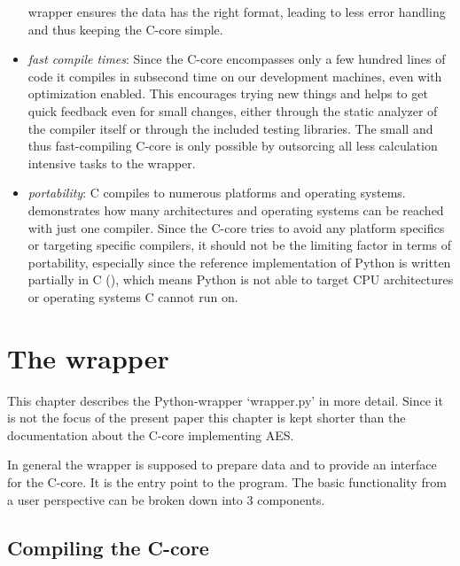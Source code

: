\begin{itemize}
  wrapper ensures the data has the right format, leading to less error
  handling and thus keeping the C-core simple.
\item
  \emph{fast compile times}: Since the C-core encompasses only a few
  hundred lines of code it compiles in subsecond time on our development
  machines, even with optimization enabled. This encourages trying new
  things and helps to get quick feedback even for small changes, either
  through the static analyzer of the compiler itself or through the
  included testing libraries. The small and thus fast-compiling C-core
  is only possible by outsorcing all less calculation intensive tasks to
  the wrapper.
\item
  \emph{portability}: C compiles to numerous platforms and operating
  systems. \cite{gccsys} demonstrates how
  many architectures and operating systems can be reached with just one
  compiler. Since the C-core tries to avoid any platform specifics or
  targeting specific compilers, it should not be the limiting factor in
  terms of portability, especially since the reference implementation of
  Python is written partially in C (\cite{pyref}),
  which means Python is not able to target CPU architectures or
  operating systems C cannot run on.
\end{itemize}


\hypertarget{the-wrapper}{%
\section{The wrapper}\label{the-wrapper}}

This chapter describes the Python-wrapper `wrapper.py' in more detail.
Since it is not the focus of the present paper this chapter is kept
shorter than the documentation about the C-core implementing AES.

In general the wrapper is supposed to prepare data and to provide an
interface for the C-core. It is the entry point to the program. The
basic functionality from a user perspective can be broken down into 3
components.

\hypertarget{compiling-the-c-core}{%
\subsection{Compiling the C-core}\label{compiling-the-c-core}}

